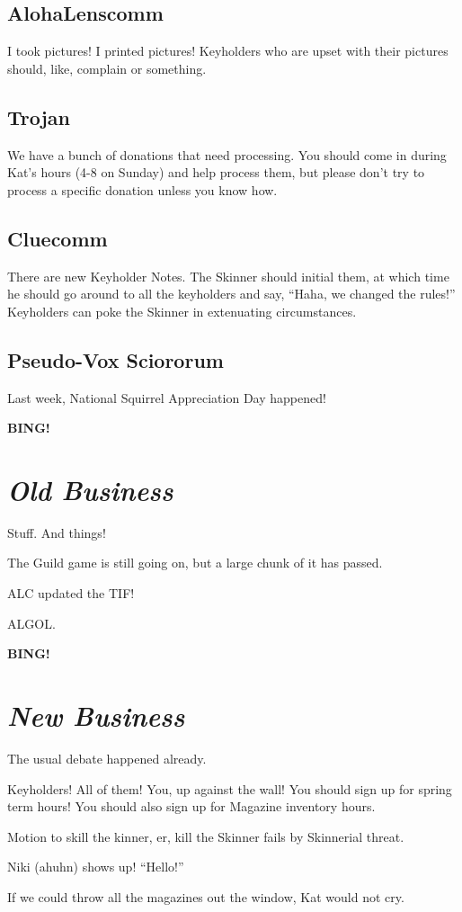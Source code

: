 \documentclass[10pt]{article}
\newcommand{\bing}{{\bf BING!} }
\newcommand{\goto}[1]{\bing \vskip 12pt \section*{{\em{#1}}}}
\begin{document}
\subsection*{AlohaLenscomm}
I took pictures!  I printed pictures!  Keyholders who are upset with their pictures should, like, complain or something.

\subsection*{Trojan}

We have a bunch of donations that need processing.  You should come in during Kat's hours (4-8 on Sunday) and help process them, but please don't try to process a specific donation unless you know how.

\subsection*{Cluecomm}

There are new Keyholder Notes.  The Skinner should initial them, at which time he should go around to all the keyholders and say, ``Haha, we changed the rules!''  Keyholders can poke the Skinner in extenuating circumstances.


\subsection*{Pseudo-Vox Sciororum}

Last week, National Squirrel Appreciation Day happened!

\goto{Old Business}

Stuff.  And things! 

The Guild game is still going on, but a large chunk of it has passed.

ALC updated the TIF!

ALGOL.

\goto{New Business}

The usual debate happened already.

Keyholders!  All of them!  You, up against the wall!  You should sign up for spring term hours!  You should also sign up for Magazine inventory hours.

Motion to skill the kinner, er, kill the Skinner fails by Skinnerial threat.

Niki (ahuhn) shows up! ``Hello!''

If we could throw all the magazines out the window, Kat would not cry. 
\end{document}
